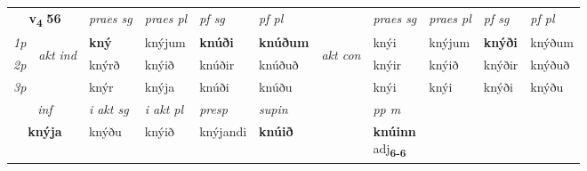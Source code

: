 \noindent
\begin{tabular}{lllllllllll} \toprule
\multicolumn{2}{c}{\textbf{v{\textsubscript{4}}} \Large{\textbf{56}}}  &  \textit{praes sg}  & \textit{praes pl}  &\textit{ pf sg} & \textit{pf pl} &  &  \textit{praes sg}  & \textit{praes pl}  & \textit{pf sg} & \textit{pf pl } \\*
	\cmidrule{3-6} \cmidrule{8-11}
 {\textit{1p}} & \multirow{3}{*}{\begin{turn}{90}\textit{akt ind}\end{turn}} & \textbf{kný} & knýjum & \textbf{knúði} & \textbf{knúðum} & \multirow{3}{*}{\begin{turn}{90}\textit{akt con}\end{turn}} &knýi & knýjum & \textbf{knýði} & knýðum\\*
 {\textit{2p}} &  &  knýrð  & knýið & knúðir & knúðuð & & knýir & knýið & knýðir & knýðuð \\*
{\textit{3p}} &  & knýr & knýja & knúði & knúðu & & knýi & knýi& knýði & knýðu \\*
\cmidrule{3-6} \cmidrule{8-11}

   \multicolumn{2}{c}{\textit{inf}}  & \textit{i akt sg} & \textit{i akt pl}   & \textit{presp} & \textit{supin}  && \textit{pp m} \\*
  \multicolumn{2}{c}{\textbf{knýja}} & knýðu  & knýið   & knýjandi &  \textbf{knúið}  && \specialcell{\textbf{knúinn} \\ adj\textbf{\textsubscript{6-6}}} \\*
\end{tabular}

